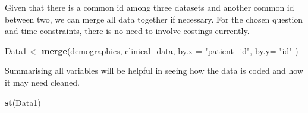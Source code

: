 \documentclass[
]{article}
\newenvironment{Shaded}{\begin{snugshade}}{\end{snugshade}}
\newcommand{\AttributeTok}[1]{\textcolor[rgb]{0.13,0.29,0.53}{#1}}
\newcommand{\FunctionTok}[1]{\textcolor[rgb]{0.13,0.29,0.53}{\textbf{#1}}}
\newcommand{\NormalTok}[1]{#1}
\newcommand{\OtherTok}[1]{\textcolor[rgb]{0.56,0.35,0.01}{#1}}
\newcommand{\StringTok}[1]{\textcolor[rgb]{0.31,0.60,0.02}{#1}}
\begin{document}
Given that there is a common id among three datasets and another common
id between two, we can merge all data together if necessary. For the
chosen question and time constraints, there is no need to involve
costings currently.

\begin{Shaded}
\begin{Highlighting}[]
\NormalTok{Data1 }\OtherTok{\textless{}{-}} \FunctionTok{merge}\NormalTok{(demographics, clinical\_data, }\AttributeTok{by.x =} \StringTok{"patient\_id"}\NormalTok{, }\AttributeTok{by.y=} \StringTok{"id"}\NormalTok{ )}
\end{Highlighting}
\end{Shaded}

Summarising all variables will be helpful in seeing how the data is
coded and how it may need cleaned.

\begin{Shaded}
\begin{Highlighting}[]
\FunctionTok{st}\NormalTok{(Data1)}
\end{Highlighting}
\end{Shaded}
\end{document}
